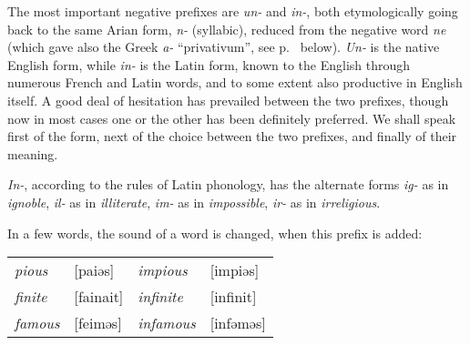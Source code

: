\label{ch:13}
\label{negative_un_in}

The most important negative prefixes are \textit{un-} and \textit{in-}, both etymologically going back to the same Arian %
form, \textit{n-} (syllabic), reduced from the negative word \textit{ne} (which gave also the Greek \textit{a-} ``privativum'', %
see p.~\pageref{prefix_a} below). %
\textit{Un-} is the native English form, while 
\textit{in-} is the Latin form, known to the English through numerous 
French and Latin words, and to some extent also productive in English itself. A good deal of hesitation has prevailed between the two prefixes, though now in most cases one or the other has been definitely preferred. We shall speak first of the form, next of the choice between the two prefixes, and finally of their meaning.


\label{sound_change}\textit{In-}, according to the rules of Latin phonology, has the alternate forms \textit{ig-} as in \textit{ignoble}, \textit{il-} as in \textit{illiterate}, \textit{im-} as in \textit{impossible}, \textit{ir-} as in \textit{irreligious}. 


In a few words, the sound of a word is changed, when this prefix is added:

\bigskip

\begin{tabular}{@{}llll@{}}
 \textit{pious}& [paiəs]& \textit{impious}& [impiəs]\\
 \textit{finite}& [fainait]& \textit{infinite}& [infinit]\\ %
 \textit{famous}& [feiməs]& \textit{infamous}& [infəməs]\\
\end{tabular}

